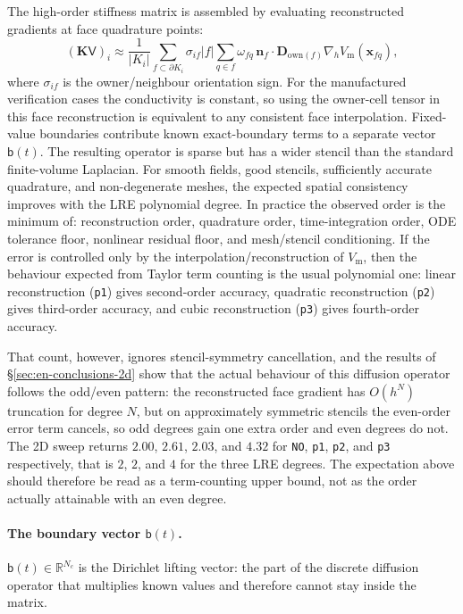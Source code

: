 \documentclass[11pt,a4paper]{article}
\newcommand{\code}[1]{\texttt{\small #1}}
\newcommand{\Vm}{V_{\text{m}}}
\newcommand{\Dten}{\mathbf{D}}
\newcommand{\grad}{\nabla}
\newcommand{\Kstif}{\mathbf{K}}
\newcommand{\R}{\mathbb{R}}
\begin{document}
The high-order stiffness matrix is assembled by evaluating reconstructed
gradients at face quadrature points:
\begin{equation}
  (\Kstif\mathsf{V})_i
  \approx
  \frac{1}{|K_i|}
  \sum_{f\subset\partial K_i}\sigma_{if}
  |f|\sum_{q\in f}\omega_{fq}\,
  \mathbf{n}_f\cdot\Dten_{\mathrm{own}(f)}
  \grad_h \Vm(\mathbf{x}_{fq}),
  \label{eq:ho-face}
\end{equation}
where $\sigma_{if}$ is the owner/neighbour orientation sign. For the
manufactured verification cases the conductivity is constant, so using the
owner-cell tensor in this face reconstruction is equivalent to any consistent
face interpolation. Fixed-value boundaries contribute known exact-boundary
terms to a separate vector $\mathsf{b}(t)$.
The resulting operator is sparse but has a wider stencil than the standard
finite-volume Laplacian. For smooth fields, good stencils, sufficiently accurate
quadrature, and non-degenerate meshes, the expected spatial consistency improves
with the LRE polynomial degree. In practice the observed order is the minimum
of: reconstruction order, quadrature order, time-integration order, ODE
tolerance floor, nonlinear residual floor, and mesh/stencil conditioning.
If the error is controlled only by the interpolation/reconstruction of $\Vm$,
then the behaviour expected from Taylor term counting is the usual polynomial
one: linear reconstruction (\code{p1}) gives second-order accuracy, quadratic
reconstruction (\code{p2}) gives third-order accuracy, and cubic
reconstruction (\code{p3}) gives fourth-order accuracy.

That count, however, ignores stencil-symmetry cancellation, and the results of
\S\ref{sec:en-conclusions-2d} show that the actual behaviour of this diffusion
operator follows the odd/even pattern: the reconstructed face gradient has
$O(h^N)$ truncation for degree $N$, but on approximately symmetric stencils the
even-order error term cancels, so odd degrees gain one extra order and even
degrees do not. The 2D sweep returns $2.00$, $2.61$, $2.03$, and $4.32$ for
\code{NO}, \code{p1}, \code{p2}, and \code{p3} respectively, that is $2$, $2$,
and $4$ for the three LRE degrees. The expectation above should therefore be
read as a term-counting upper bound, not as the order actually attainable with
an even degree.

\paragraph{The boundary vector $\mathsf{b}(t)$.}
$\mathsf{b}(t)\in\R^{N_c}$ is the Dirichlet lifting vector: the part of the
discrete diffusion operator that multiplies known values and therefore cannot
stay inside the matrix.
\end{document}
